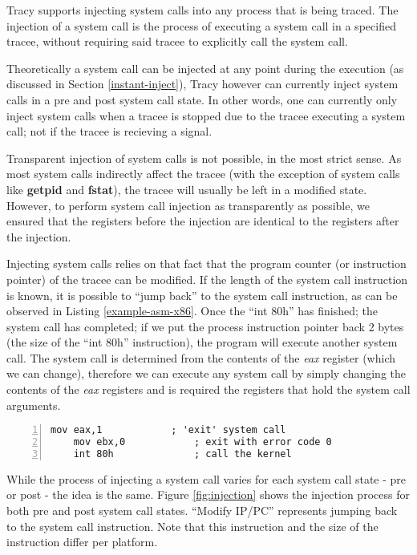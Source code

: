 \documentclass[a4paper, 10pt]{report}
\begin{document}
Tracy supports injecting system calls into any process that is being traced.
The injection of a system call is the process of executing a system call in
a specified tracee, without requiring said tracee to explicitly call the
system call.

Theoretically a system call can be injected at any point during
the execution (as discussed in Section \ref{instant-inject}),
Tracy however can currently inject system calls in a pre and post
system call state. In other words, one can currently only inject system calls
when a tracee is stopped due to the tracee executing a system call; not if
the tracee is recieving a signal.

Transparent injection of system calls is not possible, in the most strict sense.
As most system calls indirectly affect the tracee (with the exception of system
calls like \textbf{getpid} and \textbf{fstat}), the tracee will usually
be left in a modified state. However, to perform system call injection as
transparently as possible, we ensured that the registers before the injection
are identical to the registers after the injection.

Injecting system calls relies on that fact that the program counter (or
instruction pointer) of the tracee can be modified. If the length of the system
call instruction is known, it is possible to ``jump back'' to the system call
instruction, as can be observed in Listing \ref{example-asm-x86}.
Once the ``int 80h'' has finished; the system call has completed;
if we put the process instruction pointer back 2 bytes
(the size of the ``int 80h'' instruction), the program will execute
another system call. The system call is determined from
the contents of the \textit{eax} register (which we can change),
therefore we can execute any system call by simply changing the contents
of the \textit{eax} registers and is required the registers that hold the
system call arguments.

\begin{lstlisting}[numbers=left,label=example-asm-x86]
    mov eax,1            ; 'exit' system call
    mov ebx,0            ; exit with error code 0
    int 80h              ; call the kernel
\end{lstlisting}
\lstset{
    language=Python,
    caption=
}

While the process of injecting a system call varies for each system call state -
pre or post - the idea is the same. Figure \ref{fig:injection} shows the
injection process for both pre and post system call states. ``Modify IP/PC''
represents jumping back to the system call instruction. Note that this
instruction and the size of the instruction differ per platform.
\end{document}
